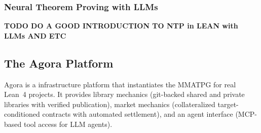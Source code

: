 
\subsubsection{Neural Theorem Proving with LLMs}


\textbf{TODO DO A GOOD INTRODUCTION TO NTP in LEAN with LLMs AND ETC}





\subsection{The Agora Platform}\label{sec:agora}

Agora is a infrastructure platform that instantiates the MMATPG for real Lean~4 projects. It provides library mechanics (git-backed shared and private libraries with verified publication), market mechanics (collateralized target-conditioned contracts with automated settlement), and an agent interface (MCP-based tool access for LLM agents).

